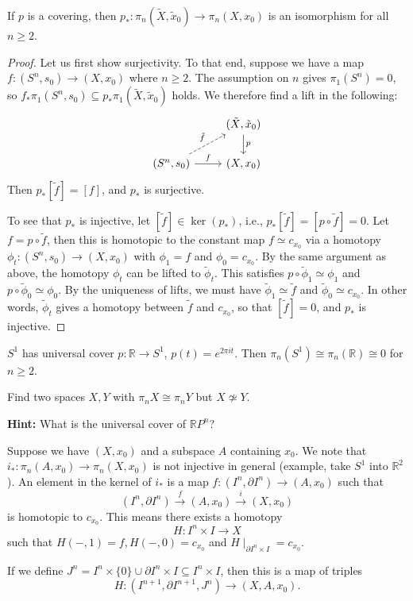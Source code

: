 \documentclass[ma3408.tex]{subfiles}
\begin{document}
\begin{Prop}
	If $p$ is a covering, then $p_* \colon \pi_n(\tilde X,\tilde x_0) \to \pi_n(X,x_0)$ is an isomorphism for all $ n \ge 2$. 
\end{Prop}
\begin{proof}
Let us first show surjectivity. To that end, suppose we have a map $f \colon (S^n,s_0) \to (X,x_0)$ where $n \ge 2$. The assumption on  $n$ gives $\pi_1(S^n) = 0$, so $f_*\pi_1(S^n,s_0) \subseteq p_*\pi_1(\tilde X,\tilde x_0)$ holds. We therefore find a lift in the following:
\[\begin{tikzcd}
	& {(\tilde X,\tilde x_0)} \\
	{(S^n,s_0)} & {(X,x_0)}
	\arrow["f", from=2-1, to=2-2]
	\arrow["p", from=1-2, to=2-2]
	\arrow["{\tilde f}", dashed, from=2-1, to=1-2]
\end{tikzcd}\]
Then $p_*[\tilde f] = [f]$, and $p_*$ is surjective. 

To see that $p_*$ is injective, let $[\tilde f] \in \ker(p_*)$, i.e., $p_*[\tilde f] = [p \circ \tilde f] = 0$. Let $f = p \circ \tilde f$, then this is homotopic to the constant map $f \simeq c_{x_0}$ via a homotopy $\phi_t \colon (S^n,s_0) \to (X,x_0)$ with $\phi_1 =f $ and $\phi_0 = c_{x_0}$. By the same argument as above, the homotopy $\phi_t$ can be lifted to $\tilde \phi_t$. This satisfies $p \circ \tilde \phi_1 \simeq \phi_1 $ and $p \circ \tilde \phi_0 \simeq \phi_0$. By the uniqueness of lifts, we must have $\tilde \phi_1 \simeq \tilde f$ and $\tilde \phi_0 \simeq c_{x_0}$. In other words, $\tilde \phi_t$ gives a homotopy between $\tilde f$ and $c_{x_0}$, so that $[\tilde f]  = 0$, and $p_*$ is injective. 
\end{proof}
\begin{Exa}
	$S^1$ has universal cover $p \colon \mathbb{R} \to S^1$, $p(t) = e^{2\pi i t}$. Then $\pi_n(S^1) \cong \pi_n(\mathbb{R}) \cong 0$ for $n \ge 2$. 
\end{Exa}
\begin{exercise}{}{}
	Find two spaces $X,Y$ with $\pi_nX \cong \pi_nY$ but $X \not \simeq Y$. 

	\textbf{Hint: } What is the universal cover of $\mathbb{R}P^n$?
\end{exercise}
\begin{Rem}
	Suppose we have $(X,x_0)$ and a subspace $A$ containing $x_0$. We note that $i_* \colon \pi_n(A,x_0) \to \pi_n(X,x_0)$ is not injective in general (example, take $S^1$ into $\mathbb{R}^2$). An element in the kernel of $i_*$ is a map $f \colon (I^n,\partial I^n) \to (A,x_0)$ such that 
	\[
(I^n,\partial I^n) \xrightarrow{f} (A,x_0) \xrightarrow{i} (X,x_0)
	\] 
	is homotopic to $c_{x_0}$. This means there exists a homotopy
	\[
H \colon I^n \times I \to X
	\]
	such that $H(-,1) = f, H(-,0) = c_{x_0}$ and $H \mid_{\partial I^n \times I} = c_{x_0}$. 

	If we define $J^n = I^n \times \{ 0 \} \cup \partial I^n \times I \subseteq I^n \times I$, then this is a map of triples
	\[
H \colon (I^{n+1},\partial I^{n+1},J^n) \to (X,A,x_0). 
	\] 
\end{Rem}
\end{document}
